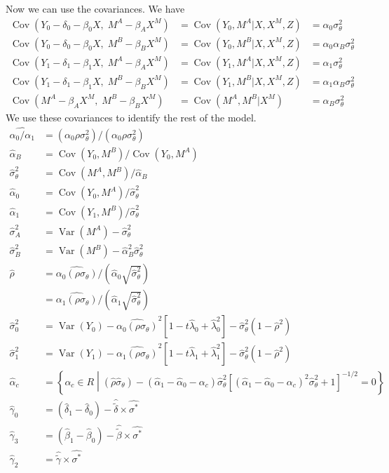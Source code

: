 \documentclass[11pt,letterpaper]{article}
\DeclareMathOperator{\Var}{Var}
\DeclareMathOperator{\Cov}{Cov}
\begin{document}
Now we can use the covariances. We have
\begin{align*}
\Cov(Y_0 - \delta_0 - \beta_0 X,\; M^A - \beta_A X^M) &= \Cov(Y_0, M^A | X, X^M, Z) &= \alpha_0 \sigma^2_\theta \\
\Cov(Y_0 - \delta_0 - \beta_0 X,\; M^B - \beta_B X^M) &= \Cov(Y_0, M^B | X, X^M, Z) &= \alpha_0 \alpha_B \sigma^2_\theta \\
\Cov(Y_1 - \delta_1 - \beta_1 X,\; M^A - \beta_A X^M) &= \Cov(Y_1, M^A | X, X^M, Z) &= \alpha_1 \sigma^2_\theta \\
\Cov(Y_1 - \delta_1 - \beta_1 X,\; M^B - \beta_B X^M) &= \Cov(Y_1, M^B | X, X^M, Z) &= \alpha_1 \alpha_B \sigma^2_\theta \\
\Cov(M^A - \beta_A X^M         ,\; M^B - \beta_B X^M) &= \Cov(M^A, M^B | X^M      ) &= \alpha_B \sigma^2_\theta
\end{align*}
We use these covariances to identify the rest of the model. 
\begin{align*}
\widehat{\alpha_0 / \alpha_1} &= (\alpha_0\rho\sigma^2_\theta)/(\alpha_0\rho\sigma^2_\theta) \\
\widehat \alpha_B &= \Cov(Y_0, M^B)/\Cov(Y_0, M^A)  \\
\widehat \sigma^2_\theta &= \Cov(M^A, M^B)/\widehat \alpha_B  \\
\widehat \alpha_0 &= \Cov(Y_0, M^A)/ \widehat\sigma_\theta^2  \\
\widehat \alpha_1 &= \Cov(Y_1, M^B)/ \widehat\sigma_\theta^2  \\
\widehat \sigma^2_A &= \Var(M^A) - \widehat\sigma^2_\theta  \\
\widehat \sigma^2_B  &= \Var(M^B) - \widehat \alpha_B^2 \widehat \sigma^2_\theta  \\
\widehat \rho &= \widehat{ \alpha_0 (\rho\sigma_\theta)} / (\widehat \alpha_0 \sqrt{\widehat \sigma_\theta^2})  \\
              &= \widehat{ \alpha_1 (\rho\sigma_\theta)} / (\widehat \alpha_1 \sqrt{\widehat \sigma_\theta^2})  \\
\widehat \sigma_0^2 &= \Var(Y_0) - \widehat{ \alpha_0 (\rho\sigma_\theta)}^2\left[ 1 - t\widehat \lambda_0 + \widehat \lambda_0^2 \right] - \widehat \sigma^2_\theta(1-\widehat \rho^2) \\
\widehat \sigma_1^2 &= \Var(Y_1) - \widehat{ \alpha_1 (\rho\sigma_\theta)}^2\left[ 1 - t\widehat \lambda_1 + \widehat \lambda_1^2 \right] - \widehat \sigma^2_\theta(1-\widehat \rho^2) \\
\widehat \alpha_c &= \left\{ \alpha_c \in R \middle | (\widehat \rho \widehat \sigma_\theta) - (\widehat \alpha_1 - \widehat \alpha_0 - \alpha_c)\widehat \sigma^2_\theta \left[(\widehat \alpha_1 - \widehat \alpha_0 - \alpha_c)^2 \widehat \sigma_\theta^2 + 1 \right]^{-1/2} =0 \right\} \\
\widehat \gamma_0 &= \left( \widehat \delta_1 -\widehat \delta_0 \right) - \widehat{\widetilde{\delta}} \times \widehat{\sigma^*} \\
\widehat \gamma_3 &= \left( \widehat \beta_1 - \widehat\beta_0 \right) - \widehat{\widetilde{\beta}} \times \widehat {\sigma^*} \\
\widehat \gamma_2 &= \widehat{\widetilde \gamma}\times \widehat{\sigma^*}
\end{align*}
\end{document}
